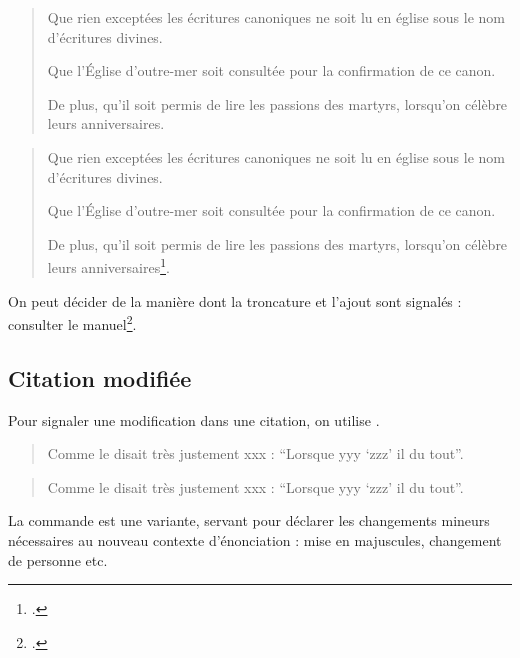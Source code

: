 \begin{latexcode}
\begin{quotation}
Que rien exceptées les écritures canoniques ne soit lu
en église sous le nom d’écritures divines.

Que l’Église d'outre-mer soit consultée pour la confirmation de ce canon.

De plus, qu'il soit permis de lire les passions des martyrs,
lorsqu'on célèbre leurs anniversaires.
\end{quotation}
\end{latexcode}

	\begin{quotation}
	Que rien exceptées les écritures canoniques ne soit lu en église sous le nom d’écritures divines.

Que l’Église d'outre-mer soit consultée pour la confirmation de ce canon.

De plus, qu'il soit permis de lire les passions des martyrs, lorsqu'on célèbre leurs anniversaires\footcite{BreveHippone}.
	\end{quotation}

\begin{plusloins}
On peut décider de la manière dont la troncature et l'ajout sont signalés : consulter le manuel\footcite{csquotes_ellipses}.
\end{plusloins}

\subsection{Citation modifiée}

Pour signaler une modification dans une citation, on utilise  .
\begin{latexcode}
\begin{quotation}
Comme le disait très justement xxx : \enquote{Lorsque yyy 
\enquote{zzz} il  du tout}.
\end{quotation}
\end{latexcode}

\begin{quotation}
	Comme le disait très justement xxx : \enquote{Lorsque yyy  \enquote{zzz} il  du tout}.
\end{quotation}

La commande  est une variante, servant pour déclarer les changements mineurs nécessaires au nouveau contexte d'énonciation : mise en majuscules, changement de personne etc.

